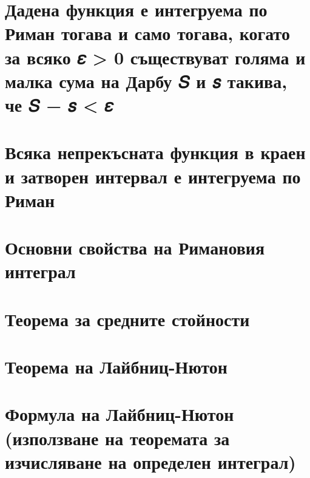 \documentclass[fleqn,12pt]{article}
\begin{document}
\begin{flushleft}
\section{Дадена функция е интегруема по Риман тогава и само тогава, когато за всяко 𝜀 > 0 съществуват голяма и малка сума на Дарбу 𝑆 и 𝑠 такива, че 𝑆 − 𝑠 < 𝜀}
\section{Всяка непрекъсната функция в краен и затворен интервал е интегруема по Риман}
\section{Основни свойства на Римановия интеграл}
\section{Теорема за средните стойности}
\section{Теорема на Лайбниц-Нютон}
\section{Формула на Лайбниц-Нютон (използване на теоремата за изчисляване на определен интеграл)}


\end{flushleft}
\end{document}
